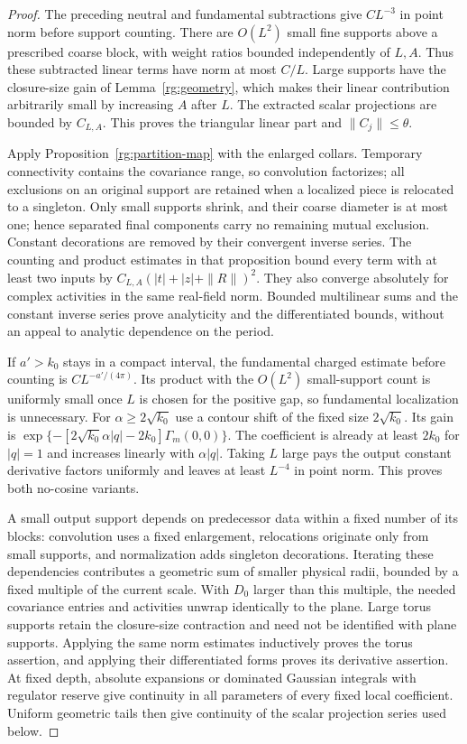 \begin{proof}
The preceding neutral and fundamental subtractions give
$CL^{-3}$ in point norm before support counting.  There are
$O(L^2)$ small fine supports above a prescribed coarse block, with
weight ratios bounded independently of $L,A$.  Thus these subtracted
linear terms have norm at most $C/L$.  Large supports have the
closure-size gain of Lemma~\ref{rg:geometry}, which makes their
linear contribution arbitrarily small by increasing $A$ after $L$.
The extracted scalar projections are bounded by $C_{L,A}$.
This proves the triangular linear part and $\|C_j\|\le\theta$.

Apply Proposition~\ref{rg:partition-map} with the enlarged collars.
Temporary connectivity contains the covariance range, so convolution
factorizes; all exclusions on an original support are retained when
a localized piece is relocated to a singleton.  Only small supports
shrink, and their coarse diameter is at most one; hence separated
final components carry no remaining mutual exclusion.  Constant
decorations are removed by their convergent inverse series.
The counting and product estimates in that proposition bound every
term with at least two inputs by
$C_{L,A}(|t|+|z|+\|R\|)^2$.  They also converge absolutely for complex
activities in the same real-field norm.  Bounded multilinear sums and
the constant inverse series prove analyticity and the differentiated
bounds, without an appeal to analytic dependence on the period.

If $a'>k_0$ stays in a compact interval, the fundamental charged
estimate before counting is $CL^{-a'/(4\pi)}$.  Its product with the
$O(L^2)$ small-support count is uniformly small once $L$ is chosen
for the positive gap, so fundamental localization is unnecessary.
For $\alpha\ge2\sqrt{k_0}$ use a contour shift of the fixed size
$2\sqrt{k_0}$.  Its gain is
$\exp\{-[2\sqrt{k_0}\alpha|q|-2k_0]\Gamma_m(0,0)\}$.
The coefficient is already at least $2k_0$ for $|q|=1$ and increases
linearly with $\alpha|q|$.  Taking $L$ large pays the output constant
derivative factors uniformly and leaves at least $L^{-4}$ in point
norm.  This proves both no-cosine variants.

A small output support depends on predecessor data within a fixed
number of its blocks: convolution uses a fixed enlargement,
relocations originate only from small supports, and normalization
adds singleton decorations.  Iterating these dependencies contributes
a geometric sum of smaller physical radii, bounded by a fixed
multiple of the current scale.  With $D_0$ larger than this multiple,
the needed covariance entries and activities unwrap identically to
the plane.  Large torus supports retain the closure-size contraction
and need not be identified with plane supports.  Applying the same
norm estimates inductively proves the torus assertion, and applying
their differentiated forms proves its derivative assertion.
At fixed depth, absolute expansions or dominated Gaussian integrals
with regulator reserve give continuity in all parameters of every
fixed local coefficient.  Uniform geometric tails then give
continuity of the scalar projection series used below.
\end{proof}

